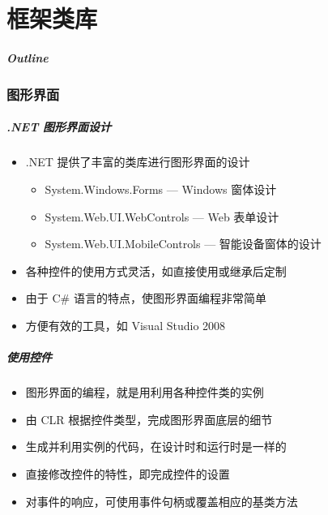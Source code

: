 
\part{框架类库}
\begin{frame}
\frametitle{Outline}            %
\tableofcontents
\end{frame}

\section{图形界面}

\begin{frame}
\frametitle{.NET 图形界面设计}
\begin{itemize}
\setlength{\itemsep}{8pt plus 1pt}
\item .NET 提供了丰富的类库进行图形界面的设计
\begin{itemize}
\item System.Windows.Forms --- Windows 窗体设计
\item System.Web.UI.WebControls --- Web 表单设计
\item System.Web.UI.MobileControls --- 智能设备窗体的设计
\end{itemize}
\item 各种控件的使用方式灵活，如直接使用或继承后定制
\item 由于 C\# 语言的特点，使图形界面编程非常简单
\item 方便有效的工具，如 Visual Studio 2008 
\end{itemize}
\end{frame}

\begin{frame}
\frametitle{使用控件}
\begin{itemize}
\setlength{\itemsep}{8pt plus 1pt}
\item 图形界面的编程，就是用利用各种控件类的实例
\item 由 CLR 根据控件类型，完成图形界面底层的细节
\item 生成并利用实例的代码，在设计时和运行时是一样的
\item 直接修改控件的特性，即完成控件的设置
\item 对事件的响应，可使用事件句柄或覆盖相应的基类方法
\end{itemize}
\end{frame}

